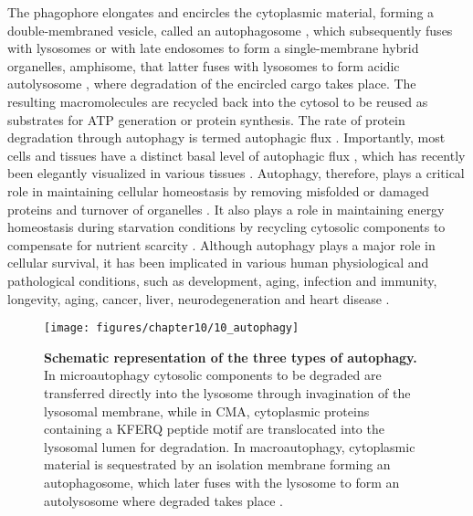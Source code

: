 The phagophore elongates and encircles the cytoplasmic material, forming a double-membraned vesicle, called an autophagosome \citep{Cai2012,Levine2008}, which subsequently fuses with lysosomes or with late endosomes to form a single-membrane hybrid organelles, amphisome, that latter fuses with lysosomes to form acidic autolysosome \citep{Cai2012,Nixon2011,sarkar2013}, where degradation of the encircled cargo takes place. The resulting macromolecules are recycled back into the cytosol to be reused as substrates for ATP generation or protein synthesis. The rate of protein degradation through autophagy is termed autophagic flux \citep{klionsky2016,loos2014}. Importantly, most cells and tissues have a distinct basal level of autophagic flux \citep{Mizushima2004a}, which has recently been elegantly visualized in various tissues \citep{Kaizuka2016}.  Autophagy, therefore, plays a critical role in maintaining cellular homeostasis by removing misfolded or damaged proteins and turnover of organelles \citep{Levine2008}. It also plays a role in maintaining energy homeostasis during starvation conditions by recycling cytosolic components to compensate for nutrient scarcity \citep{Levine2008,Loos2009}. Although autophagy plays a major role in cellular survival, it has been implicated in various human physiological and pathological conditions, such as development, aging, infection and immunity, longevity, aging, cancer, liver, neurodegeneration and heart disease \citep{Meijer2006,Mizushima2008,Ravikumar2010b,sarkar2013}.

\begin{figure}[!htbp]
  \texttt{[image: figures/chapter10/10\_autophagy]}
  \caption[Schematic representation of the three types of autophagy]{\textbf{Schematic representation of the three types of autophagy.} In microautophagy cytosolic components to be degraded are transferred directly into the lysosome through invagination of the lysosomal membrane, while in CMA, cytoplasmic proteins containing a KFERQ peptide motif are translocated into the lysosomal lumen for degradation. In macroautophagy, cytoplasmic material is sequestrated by an isolation membrane forming an autophagosome, which later fuses with the lysosome to form an autolysosome where degraded takes place \citep{Nikoletopoulou2015}.}
  \label{fig:10_autophagy}
  \end{figure}

